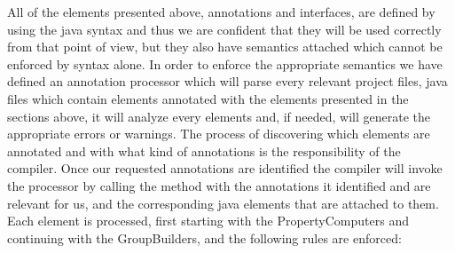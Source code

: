 	All of the elements presented above, annotations and interfaces, are defined 
by using the java syntax and thus we are confident that they will be used
correctly from that point of view, but they also have semantics attached which
cannot be enforced by syntax alone. In order to enforce the appropriate
semantics we have defined an annotation processor which will parse every
relevant project files, java files which contain elements annotated with the
elements presented in the sections above, it will analyze every elements and, if
needed, will generate the appropriate  errors or warnings.
	The process of discovering which elements are annotated and with what kind of
annotations is the responsibility of the compiler. Once our requested
annotations are identified the compiler will invoke the processor by calling
the 
method with the annotations it identified and are relevant for us, and the
corresponding java elements that are attached to them. 
	Each element is processed, first starting with the PropertyComputers and
continuing with the GroupBuilders, and the following rules are enforced:
	
